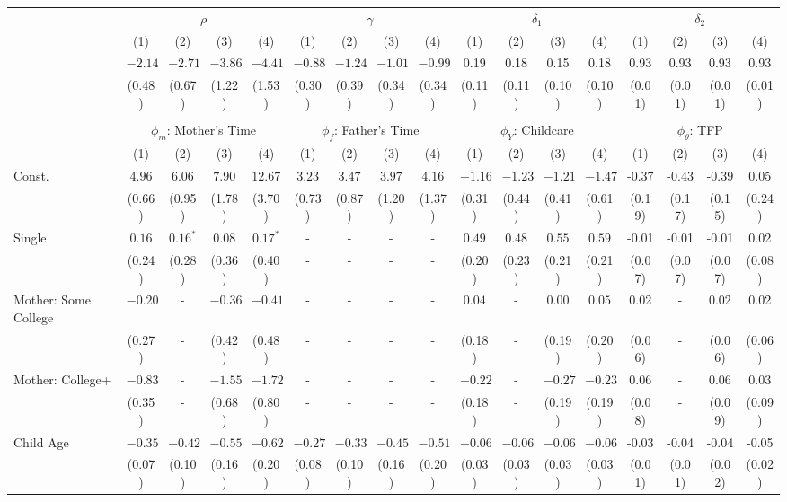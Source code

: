 \begin{tabular}{lcccccccccccccccc}\\\toprule
 & \multicolumn{4}{c}{$\rho$} & \multicolumn{4}{c}{$\gamma$} & \multicolumn{4}{c}{$\delta_{1}$} & \multicolumn{4}{c}{$\delta_{2}$} \\
&(1)&(2)&(3)&(4)&(1)&(2)&(3)&(4)&(1)&(2)&(3)&(4)&(1)&(2)&(3)&(4)\\\cmidrule(r){2-5}\cmidrule(r){6-9}\cmidrule(r){10-13}\cmidrule(r){14-17}
&$-2.14$&$-2.71$&$-3.86$&$-4.41$&$-0.88$&$-1.24$&$-1.01$&$-0.99$&0.19&0.18&0.15&0.18&0.93&0.93&0.93&0.93\\
&(0.48)&(0.67)&(1.22)&(1.53)&(0.30)&(0.39)&(0.34)&(0.34)&(0.11)&(0.11)&(0.10)&(0.10)&(0.01)&(0.01)&(0.01)&(0.01)\\
&&&&&&&&&&&&&&&&\\
 & \multicolumn{4}{c}{$\phi_{m}$: Mother's Time} & \multicolumn{4}{c}{$\phi_{f}$: Father's Time} & \multicolumn{4}{c}{$\phi_{Y}$: Childcare} & \multicolumn{4}{c}{$\phi_{\theta}$: TFP} \\
&(1)&(2)&(3)&(4)&(1)&(2)&(3)&(4)&(1)&(2)&(3)&(4)&(1)&(2)&(3)&(4)\\\cmidrule(r){2-5}\cmidrule(r){6-9}\cmidrule(r){10-13}\cmidrule(r){14-17}
Const.&$4.96$&$6.06$&$7.90$&$12.67$&$3.23$&$3.47$&$3.97$&$4.16$&$-1.16$&$-1.23$&$-1.21$&$-1.47$&-0.37&-0.43&-0.39&0.05\\
&(0.66)&(0.95)&(1.78)&(3.70)&(0.73)&(0.87)&(1.20)&(1.37)&(0.31)&(0.44)&(0.41)&(0.61)&(0.19)&(0.17)&(0.15)&(0.24)\\
Single&$0.16$&$0.16^{*}$&$0.08$&$0.17^{*}$&-&-&-&-&$0.49$&$0.48$&$0.55$&$0.59$&-0.01&-0.01&-0.01&0.02\\
&(0.24)&(0.28)&(0.36)&(0.40)&-&-&-&-&(0.20)&(0.23)&(0.21)&(0.21)&(0.07)&(0.07)&(0.07)&(0.08)\\
Mother: Some College&$-0.20$&-&$-0.36$&$-0.41$&-&-&-&-&$0.04$&-&$0.00$&$0.05$&0.02&-&0.02&0.02\\
&(0.27)&-&(0.42)&(0.48)&-&-&-&-&(0.18)&-&(0.19)&(0.20)&(0.06)&-&(0.06)&(0.06)\\
Mother: College+&$-0.83$&-&$-1.55$&$-1.72$&-&-&-&-&$-0.22$&-&$-0.27$&$-0.23$&0.06&-&0.06&0.03\\
&(0.35)&-&(0.68)&(0.80)&-&-&-&-&(0.18)&-&(0.19)&(0.19)&(0.08)&-&(0.09)&(0.09)\\
Child Age&$-0.35$&$-0.42$&$-0.55$&$-0.62$&$-0.27$&$-0.33$&$-0.45$&$-0.51$&$-0.06$&$-0.06$&$-0.06$&$-0.06$&-0.03&-0.04&-0.04&-0.05\\
&(0.07)&(0.10)&(0.16)&(0.20)&(0.08)&(0.10)&(0.16)&(0.20)&(0.03)&(0.03)&(0.03)&(0.03)&(0.01)&(0.01)&(0.02)&(0.02)\\

\end{tabular}
